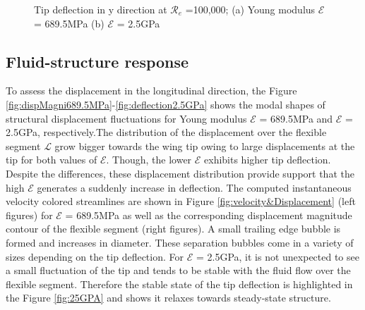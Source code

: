 \begin{figure}[hbt!]
\begin{subfigure}{.4\textwidth}
  \caption{\label{fig:deflection2.5GPa}}
\label{fig:airfoildesigna}
\end{subfigure}
\caption{\label{fig:history} Tip deflection in y direction at $\mathcal{R}_e$ =100,000; (a) Young modulus $\mathcal{E}$ = 689.5MPa  (b) $\mathcal{E}$ = 2.5GPa }
  \end{figure}

\subsection{\label{sec:fluidStrucutreRespnseToYoungAndRey} Fluid-structure response}
To assess the displacement in the longitudinal direction, the Figure \ref{fig:dispMagni689.5MPa}-\ref{fig:deflection2.5GPa} shows the modal shapes of structural displacement fluctuations for Young modulus $\mathcal{E}$ = 689.5MPa  and $\mathcal{E}$ = 2.5GPa, respectively.The distribution of the displacement over the flexible segment $\mathcal{L}$ grow bigger towards the wing tip owing to large displacements at the tip for both values of $\mathcal{E}$. Though, the lower $\mathcal{E}$ exhibits higher tip deflection. Despite the differences, these displacement distribution provide support that the high $\mathcal{E}$ generates a suddenly increase in deflection. The computed instantaneous velocity colored streamlines are shown in Figure \ref{fig:velocity&Displacement} (left figures) for $\mathcal{E}$ = 689.5MPa  as well as the corresponding displacement magnitude contour of the flexible segment (right figures). A small trailing edge bubble is formed and increases in diameter. These separation bubbles come in a variety of sizes depending on the tip deflection. For $\mathcal{E}$ = 2.5GPa, it is not unexpected to see a small fluctuation of the tip and tends to be stable with the fluid flow over the flexible segment. Therefore the stable state of the tip deflection is highlighted in the Figure \ref{fig:25GPA} and shows it relaxes towards steady-state structure.\\

